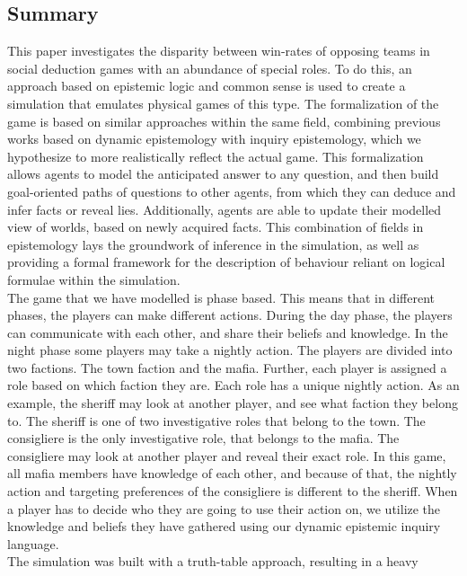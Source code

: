 \onecolumn
\begin{center}
	\section*{Summary}\label{sec:summary}
\end{center}
This paper investigates the disparity between win-rates of opposing teams in
social deduction games with an abundance of special roles. To do  this, an
approach based on epistemic logic and common sense is used to create a
simulation that emulates physical games of this type. The formalization of the
game is based on similar approaches within the same field, combining previous works based on dynamic epistemology with inquiry epistemology,
which we hypothesize to more realistically reflect the actual game. This formalization allows agents to model the anticipated answer to any question, and then build goal-oriented
paths of questions to other agents, from which they can deduce and infer facts or reveal lies. Additionally, agents are able to update their modelled view of worlds, based on newly acquired facts.
This combination of fields in epistemology lays the groundwork of inference in the simulation,
as well as providing a formal framework for the description of behaviour
reliant on logical formulae within the simulation. \\
The game that we have modelled is phase based. This means that in different phases, the players can make different actions. During the day phase, the players can communicate with each other, and share their beliefs and knowledge. In the night phase some players may take a nightly action. The players are divided into two factions. The town faction and the mafia. Further, each player is assigned a role based on which faction they are. Each role has a unique nightly action. As an example, the sheriff may look at another player, and see what faction they belong to. The sheriff is one of two investigative roles that belong to the town. The consigliere is the only investigative role, that belongs to the mafia. The consigliere may look at another player and reveal their exact role. In this game, all mafia members have knowledge of each other, and because of that, the nightly action and targeting preferences of the consigliere is different to the sheriff.
When a player has to decide who they are going to use their action on, we utilize the knowledge and beliefs they have gathered using our dynamic epistemic inquiry language. \\
The simulation was built with a truth-table approach, resulting in a heavy
